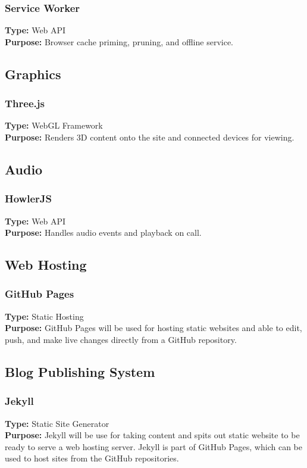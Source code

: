 \documentclass[onecolumn, draftclsnofoot,10pt, compsoc]{IEEEtran}
\begin{document}
\subsubsection{Service Worker}
\textbf{Type:} Web API\\
\textbf{Purpose:} Browser cache priming, pruning, and offline service.

\subsection{Graphics}
\subsubsection{Three.js}
\textbf{Type:} WebGL Framework\\
\textbf{Purpose:} Renders 3D content onto the site and connected devices for viewing.

\subsection{Audio}
\subsubsection{HowlerJS}
\textbf{Type:} Web API\\
\textbf{Purpose:} Handles audio events and playback on call.

\subsection{Web Hosting}
\subsubsection{GitHub Pages}
\textbf{Type:} Static Hosting\\
\textbf{Purpose:} GitHub Pages will be used for hosting static websites and able to edit, push, and make live changes directly from a GitHub repository. 

\subsection{Blog Publishing System}
\subsubsection{Jekyll}
\textbf{Type:} Static Site Generator\\
\textbf{Purpose:} Jekyll will be use for taking content and spits out static website to be ready to serve a web hosting server. Jekyll is part of GitHub Pages, which can be used to host sites from the GitHub repositories. 
\end{document}
